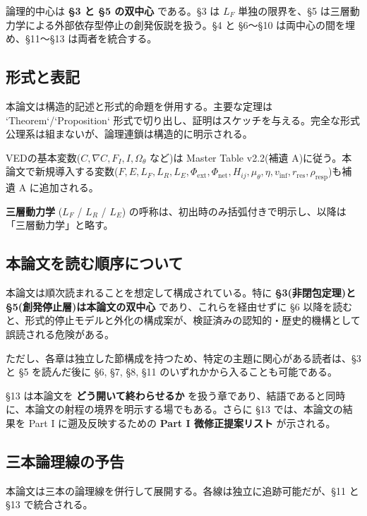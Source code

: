 論理的中心は \textbf{\S{}3 と \S{}5 の双中心} である。\S{}3 は $L_F$ 単独の限界を、\S{}5 は三層動力学による外部依存型停止の創発仮説を扱う。\S{}4 と \S{}6〜\S{}10 は両中心の間を埋め、\S{}11〜\S{}13 は両者を統合する。

\bigskip


\subsection{形式と表記}


本論文は構造的記述と形式的命題を併用する。主要な定理は `Theorem`/`Proposition` 形式で切り出し、証明はスケッチを与える。完全な形式公理系は組まないが、論理連鎖は構造的に明示される。

VEDの基本変数($C, \nabla C, F_I, I, \Omega_\theta$ など)は Master Table v2.2(補遺 A)に従う。本論文で新規導入する変数($F, E, L_F, L_R, L_E, \Phi_{\text{ext}}, \Phi_{\text{net}}, H_{ij}, \mu_\theta, \eta, v_{\text{inf}}, r_{\text{res}}, \rho_{\text{resp}}$)も補遺 A に追加される。

\textbf{三層動力学} ($L_F$ / $L_R$ / $L_E$) の呼称は、初出時のみ括弧付きで明示し、以降は「三層動力学」と略す。

\bigskip


\subsection{本論文を読む順序について}


本論文は順次読まれることを想定して構成されている。特に \textbf{\S{}3(非閉包定理)と \S{}5(創発停止層)は本論文の双中心} であり、これらを経由せずに \S{}6 以降を読むと、形式的停止モデルと外化の構成案が、検証済みの認知的・歴史的機構として誤読される危険がある。

ただし、各章は独立した節構成を持つため、特定の主題に関心がある読者は、\S{}3 と \S{}5 を読んだ後に \S{}6, \S{}7, \S{}8, \S{}11 のいずれかから入ることも可能である。

\S{}13 は本論文を \textbf{どう開いて終わらせるか} を扱う章であり、結語であると同時に、本論文の射程の境界を明示する場でもある。さらに \S{}13 では、本論文の結果を Part I に遡及反映するための \textbf{Part I 微修正提案リスト} が示される。

\bigskip


\subsection{三本論理線の予告}


本論文は三本の論理線を併行して展開する。各線は独立に追跡可能だが、\S{}11 と \S{}13 で統合される。

